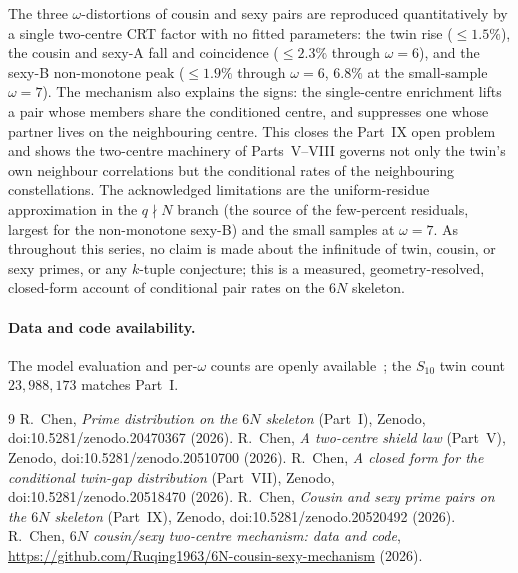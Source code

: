 \documentclass[11pt]{article}
\begin{document}
The three $\omega$-distortions of cousin and sexy pairs are reproduced
quantitatively by a single two-centre CRT factor with no fitted parameters: the
twin rise ($\le1.5\%$), the cousin and sexy-A fall and coincidence ($\le2.3\%$
through $\omega=6$), and the sexy-B non-monotone peak ($\le1.9\%$ through
$\omega=6$, $6.8\%$ at the small-sample $\omega=7$). The mechanism also explains
the signs: the single-centre enrichment lifts a pair whose members share the
conditioned centre, and suppresses one whose partner lives on the neighbouring
centre. This closes the Part~IX open problem and shows the two-centre
machinery of Parts~V--VIII governs not only the twin's own neighbour correlations
but the conditional rates of the neighbouring constellations. The acknowledged
limitations are the uniform-residue approximation in the $q\nmid N$ branch (the
source of the few-percent residuals, largest for the non-monotone sexy-B) and the
small samples at $\omega=7$. As throughout this series, no claim is made about the
infinitude of twin, cousin, or sexy primes, or any $k$-tuple conjecture; this is a
measured, geometry-resolved, closed-form account of conditional pair rates on the
$6N$ skeleton.

\paragraph{Data and code availability.}
The model evaluation and per-$\omega$ counts are openly available~\cite{repo}; the
$S_{10}$ twin count $23{,}988{,}173$ matches Part~I.

\begin{thebibliography}{9}
 R.~Chen, \emph{Prime distribution on the $6N$ skeleton} (Part~I),
Zenodo, doi:10.5281/zenodo.20470367 (2026).
 R.~Chen, \emph{A two-centre shield law} (Part~V), Zenodo,
doi:10.5281/zenodo.20510700 (2026).
 R.~Chen, \emph{A closed form for the conditional twin-gap
distribution} (Part~VII), Zenodo, doi:10.5281/zenodo.20518470 (2026).
 R.~Chen, \emph{Cousin and sexy prime pairs on the $6N$ skeleton}
(Part~IX), Zenodo, doi:10.5281/zenodo.20520492 (2026).
 R.~Chen, \emph{$6N$ cousin/sexy two-centre mechanism: data and
code}, \url{https://github.com/Ruqing1963/6N-cousin-sexy-mechanism} (2026).
\end{thebibliography}
\end{document}
